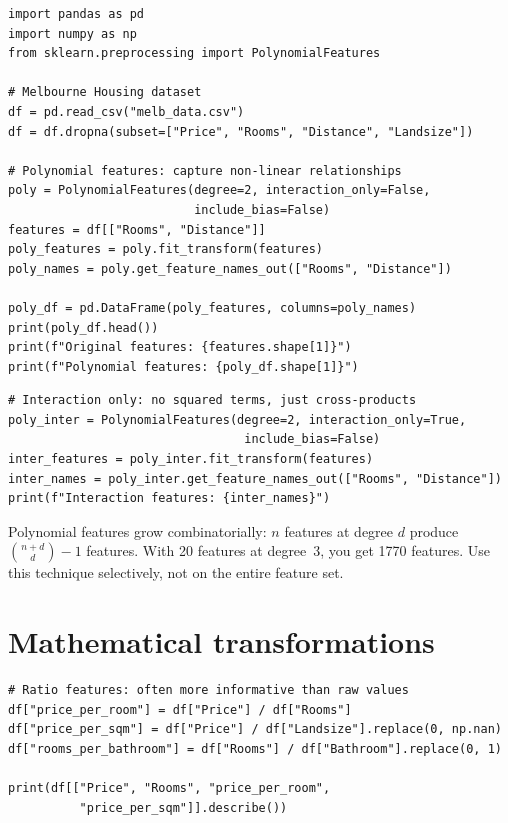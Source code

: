 \begin{verbatim}
import pandas as pd
import numpy as np
from sklearn.preprocessing import PolynomialFeatures

# Melbourne Housing dataset
df = pd.read_csv("melb_data.csv")
df = df.dropna(subset=["Price", "Rooms", "Distance", "Landsize"])

# Polynomial features: capture non-linear relationships
poly = PolynomialFeatures(degree=2, interaction_only=False,
                          include_bias=False)
features = df[["Rooms", "Distance"]]
poly_features = poly.fit_transform(features)
poly_names = poly.get_feature_names_out(["Rooms", "Distance"])

poly_df = pd.DataFrame(poly_features, columns=poly_names)
print(poly_df.head())
print(f"Original features: {features.shape[1]}")
print(f"Polynomial features: {poly_df.shape[1]}")
\end{verbatim}

\begin{verbatim}
# Interaction only: no squared terms, just cross-products
poly_inter = PolynomialFeatures(degree=2, interaction_only=True,
                                 include_bias=False)
inter_features = poly_inter.fit_transform(features)
inter_names = poly_inter.get_feature_names_out(["Rooms", "Distance"])
print(f"Interaction features: {inter_names}")
\end{verbatim}

\begin{warningbox}
Polynomial features grow combinatorially: $n$ features at degree $d$ produce $\binom{n+d}{d} - 1$ features. With 20 features at degree~3, you get 1770 features. Use this technique selectively, not on the entire feature set.
\end{warningbox}

\section{Mathematical transformations}

\begin{verbatim}
# Ratio features: often more informative than raw values
df["price_per_room"] = df["Price"] / df["Rooms"]
df["price_per_sqm"] = df["Price"] / df["Landsize"].replace(0, np.nan)
df["rooms_per_bathroom"] = df["Rooms"] / df["Bathroom"].replace(0, 1)

print(df[["Price", "Rooms", "price_per_room",
          "price_per_sqm"]].describe())
\end{verbatim}

